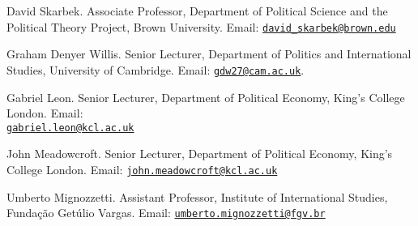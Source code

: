 \documentclass[a4paper]{article}
\renewenvironment{itemize}{
  \begin{list}{}{
    \setlength{\leftmargin}{1.5em}
  }
}{
  \end{list}
}
\begin{document}
\begin{itemize}
	\item David Skarbek. Associate Professor, Department of Political Science and the Political Theory Project, Brown University. Email: \href{mailto:davidskarbek@gmail.com}{\texttt{david\_skarbek@brown.edu}}
	\item Graham Denyer Willis. Senior Lecturer, Department of Politics and International Studies, University of Cambridge. Email: \href{gdw27@cam.ac.uk}{\texttt{gdw27@cam.ac.uk}}.
	\item Gabriel Leon. Senior Lecturer, Department of Political Economy, King's College London. Email: \\ \href{mailto:gabriel.leon@kcl.ac.uk}{\texttt{gabriel.leon@kcl.ac.uk}}
	\item John Meadowcroft. Senior Lecturer, Department of Political Economy, King's College London. Email: \href{mailto:john.meadowcroft@kcl.ac.uk}{\texttt{john.meadowcroft@kcl.ac.uk}}
	\item Umberto Mignozzetti. Assistant Professor, Institute of International Studies, Funda\c{c}\~{a}o Get\'{u}lio Vargas. Email: \href{umberto.mignozzetti@fgv.br}{\texttt{umberto.mignozzetti@fgv.br}}
\end{itemize}

\bigskip
\end{document}

